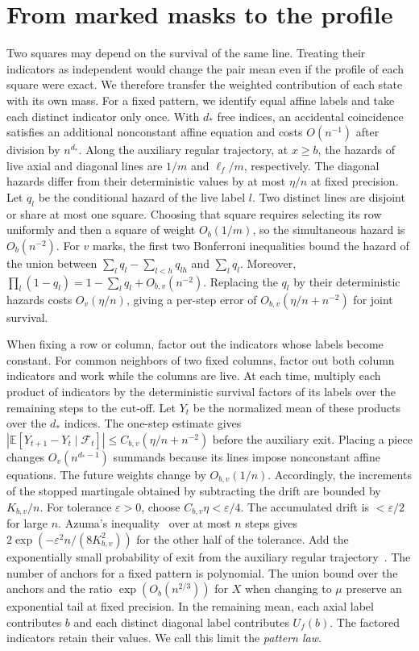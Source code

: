 \section{From marked masks to the profile}\label{app:transfer} Two squares may depend on the survival of
the same line. Treating their indicators as independent would change the pair mean even if the profile of
each square were exact. We therefore transfer the weighted contribution of each state with its own mass.
For a fixed pattern, we identify equal affine labels and take each distinct indicator only once. With
\(d_*\) free indices, an accidental coincidence satisfies an additional nonconstant affine equation and
costs \(O(n^{-1})\) after division by \(n^{d_*}\). Along the auxiliary regular trajectory, at \(x\ge b\),
the hazards of live axial and diagonal lines are \(1/m\) and \(\ell_f/m\), respectively. The diagonal
hazards differ from their deterministic values by at most \(\eta/n\) at fixed precision.
\label{paso:bonferroni-azuma} Let \(q_l\) be the conditional hazard of the live label
\(l\). Two distinct lines are disjoint or share at most one square. Choosing that square requires
selecting its row uniformly and then a square of weight \(O_b(1/m)\), so the simultaneous hazard is
\(O_b(n^{-2})\). For \(v\) marks, the first two Bonferroni inequalities bound the hazard of the union
between \(\sum_l q_l-\sum_{l<h}q_{lh}\) and \(\sum_l q_l\). Moreover, \(\prod_l(1-q_l)=1-\sum_l
q_l+O_{b,v}(n^{-2})\). Replacing the \(q_l\) by their deterministic hazards costs \(O_v(\eta/n)\), giving
a per-step error of \(O_{b,v}(\eta/n+n^{-2})\) for joint survival.

When fixing a row or column, factor out the indicators whose labels become constant. For common neighbors
of two fixed columns, factor out both column indicators and work while the columns are live. At each
time, multiply each product of indicators by the deterministic survival factors of its labels over the
remaining steps to the cut-off. Let \(Y_t\) be the normalized mean of these products over the \(d_*\)
indices. The one-step estimate gives \(|\mathbb E[Y_{t+1}-Y_t\mid\mathcal F_t]|\le
C_{b,v}(\eta/n+n^{-2})\) before the auxiliary exit. Placing a piece changes \(O_v(n^{d_*-1})\) summands
because its lines impose nonconstant affine equations. The future weights change by \(O_{b,v}(1/n)\).
Accordingly, the increments of the stopped martingale obtained by subtracting the drift are bounded by
\(K_{b,v}/n\). For tolerance \(\varepsilon>0\), choose \(C_{b,v}\eta<\varepsilon/4\). The accumulated
drift is \(<\varepsilon/2\) for large \(n\). Azuma's inequality~\cite{azuma} over at most \(n\) steps
gives
\(2\exp(-\varepsilon^2 n/(8K_{b,v}^2))\) for the other half of the tolerance. Add the exponentially small
probability of exit from the auxiliary regular trajectory~\cite[§4]{tc}. The number of anchors for a
fixed pattern is polynomial. The union bound over the anchors and the ratio \(\exp(O_b(n^{2/3}))\) for
\(X\) when changing to \(\mu\) preserve an exponential tail at fixed precision. In the remaining mean,
each axial label contributes \(b\) and each distinct diagonal label contributes \(U_f(b)\). The factored
indicators retain their values. We call this limit the \emph{pattern law}.

